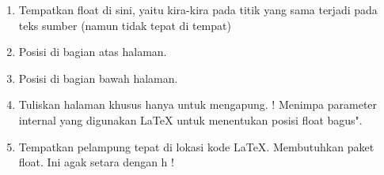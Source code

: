 \vspace{14pt}
\vspace{18pt}
\noindent
\begin{enumerate}



\item Tempatkan float di sini, yaitu kira-kira pada titik yang sama terjadi pada teks sumber (namun tidak tepat di tempat)

\item Posisi di bagian atas halaman.


\item Posisi di bagian bawah halaman.



\item Tuliskan halaman khusus hanya untuk mengapung. ! Menimpa parameter internal yang digunakan LaTeX untuk menentukan posisi float bagus".


\item Tempatkan pelampung tepat di lokasi kode LaTeX. Membutuhkan paket float. Ini agak setara dengan h !
	
\end{enumerate}

